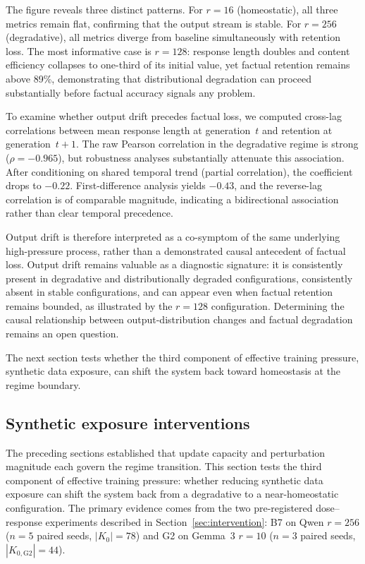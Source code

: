 \documentclass[a4paper,fleqn]{cas-dc}
\newcommand{\Kcard}{\lvert K_0\rvert}
\begin{document}
The figure reveals three distinct patterns. For $r=16$ (homeostatic), all three
metrics remain flat, confirming that the output stream is stable. For $r=256$
(degradative), all metrics diverge from baseline simultaneously with retention
loss. The most informative case is $r=128$: response length doubles and content
efficiency collapses to one-third of its initial value, yet factual retention
remains above 89\%, demonstrating that distributional degradation can proceed
substantially before factual accuracy signals any problem.

To examine whether output drift precedes factual loss, we computed cross-lag
correlations between mean response length at generation~$t$ and retention at
generation~$t{+}1$. The raw Pearson correlation in the degradative regime is
strong ($\rho = -0.965$), but robustness analyses substantially attenuate this
association. After conditioning on shared temporal trend (partial correlation),
the coefficient drops to $-0.22$. First-difference analysis yields $-0.43$, and
the reverse-lag correlation is of comparable magnitude, indicating a
bidirectional association rather than clear temporal precedence.

Output drift is therefore interpreted as a co-symptom of the same underlying
high-pressure process, rather than a demonstrated causal antecedent of factual
loss. Output drift remains valuable as a diagnostic signature: it is
consistently present in degradative and distributionally degraded configurations,
consistently absent in stable configurations, and can appear even when factual
retention remains bounded, as illustrated by the $r=128$ configuration.
Determining the causal relationship between output-distribution changes and
factual degradation remains an open question.

The next section tests whether the third component of effective training
pressure, synthetic data exposure, can shift the system back toward homeostasis
at the regime boundary.

\FloatBarrier
\subsection{Synthetic exposure interventions}\label{sec:res_intervention}

The preceding sections established that update capacity and perturbation
magnitude each govern the regime transition. This section tests the third
component of effective training pressure: whether reducing synthetic data
exposure can shift the system back from a degradative to a near-homeostatic
configuration. The primary evidence comes from the two pre-registered
dose--response experiments described in Section~\ref{sec:intervention}:
B7 on Qwen $r=256$ ($n=5$ paired seeds, $\Kcard=78$) and G2 on Gemma~3 $r=10$
($n=3$ paired seeds, $|K_{0,\mathrm{G2}}|=44$).
\end{document}
